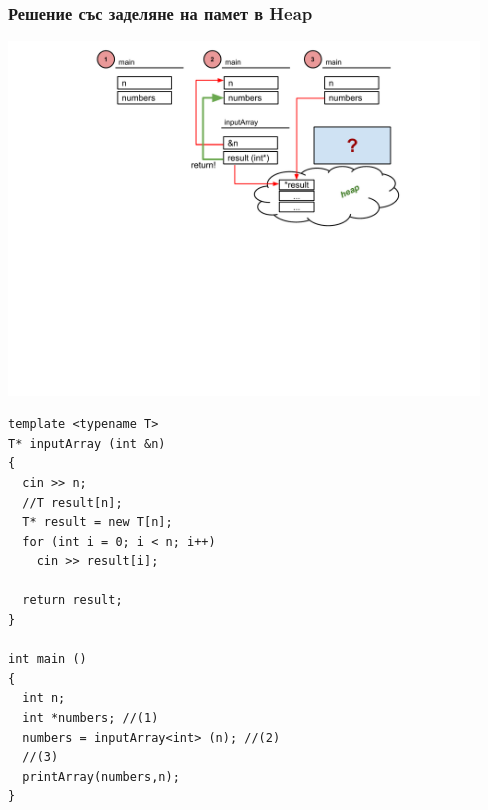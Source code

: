 \documentclass{beamer}
\begin{document}
\begin{frame}[fragile]
\frametitle{Решение със заделяне на памет в Heap}


\includegraphics[width=12.5cm]{images/heap}

\vspace{-200px}
\begin{flushleft}
\begin{lstlisting}
template <typename T>
T* inputArray (int &n)
{ 
  cin >> n;
  //T result[n];
  T* result = new T[n];
  for (int i = 0; i < n; i++)
    cin >> result[i];

  return result;
}

int main ()
{
  int n;
  int *numbers; //(1)
  numbers = inputArray<int> (n); //(2)
  //(3) 
  printArray(numbers,n);
}

\end{lstlisting}  
\end{flushleft}

\end{frame}
\end{document}
